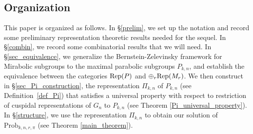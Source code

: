\documentclass[reqno]{amsart}
\theoremstyle{definition}
\theoremstyle{remark}
\numberwithin{equation}{section}
\begin{document}
\subsection{Organization} This paper is organized as follows. In \S \ref{prelim}, we set up the notation and record some preliminary representation theoretic results needed for the sequel. In \S \ref{combin}, we record some combinatorial results that we will need. In \S \ref{sec_equivalence}, we generalize the Bernstein-Zelevinsky framework for Mirabolic subgroups to the maximal parabolic subgroups $P_{k,n}$, and establish the equivalence between the categories ${\rm Rep}(P)$ and $\oplus_r {\rm Rep}(M_r)$. We then construct in \S \ref{sec_Pi_construction}, the   representation $\Pi_{k,n}$ of $P_{k,n}$ (see Definition~\ref{def_Pi}) that satisfies a universal property with respect to restriction of cuspidal representations of $G_n$ to $P_{k,n}$ (see Theorem  \ref{Pi_universal_property}). In  \S \ref{structure}, we use the representation $\Pi_{k,n}$ to obtain  our solution  of $\text{Prob}_{k,n,r,\pi}$ (see   Theorem \ref{main_theorem}).
\end{document}
